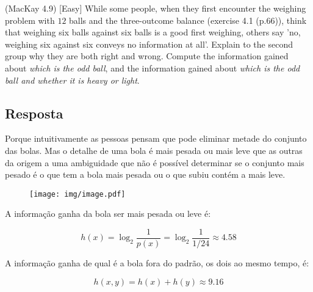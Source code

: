 (MacKay 4.9) [Easy] While some people, when they first encounter the weighing problem with $12$ balls and the three-outcome balance (exercise 4.1 (p.66)), think that weighing six balls against six balls is a good first weighing, others say 'no, weighing six against six conveys no information at all'. Explain to the second group why they are both right and wrong. Compute the information gained about \textit{which is the odd ball}, and the information gained about \textit{which is the odd ball and whether it is heavy or light}.

\subsection*{Resposta}

Porque intuitivamente as pessoas pensam que pode eliminar metade do conjunto das bolas. Mas o detalhe de uma bola é mais pesada ou mais leve que as outras da origem a uma ambiguidade que não é possível determinar se o conjunto mais pesado é o que tem a bola mais pesada ou o que subiu contém a mais leve.

\begin{figure}[!h]
	\centering
		\texttt{[image: img/image.pdf]}
\end{figure}

A informação ganha da bola ser mais pesada ou leve é:

\[h(x) = {\log _2}\frac{1}{{p(x)}} = {\log _2}\frac{1}{{1/24}} \approx 4.58\]

A informação ganha de qual é a bola fora do padrão, os dois ao mesmo tempo, é:

\[h(x,y) = h(x) + h(y) \approx 9.16\]